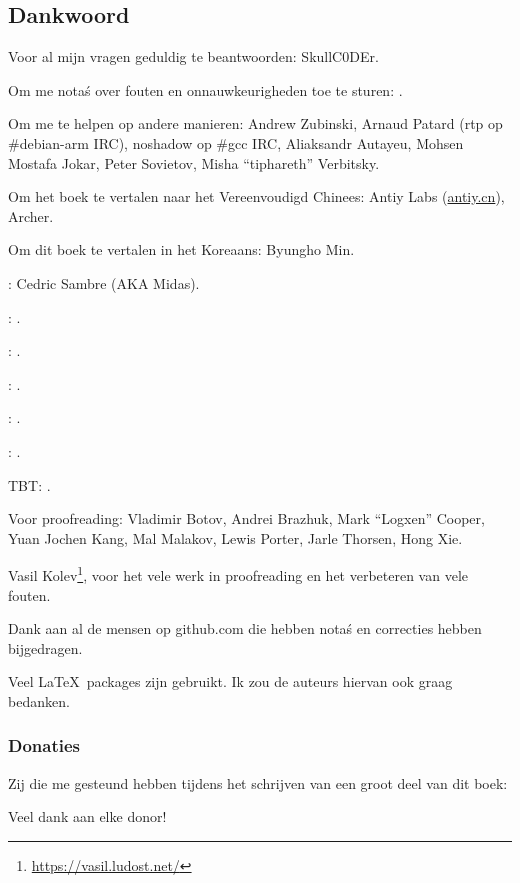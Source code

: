 \subsection*{Dankwoord}

Voor al mijn vragen geduldig te beantwoorden: SkullC0DEr.

Om me nota\'s over fouten en onnauwkeurigheden toe te sturen: \PeopleMistakesInaccuracies{}.

Om me te helpen op andere manieren:
Andrew Zubinski,
Arnaud Patard (rtp op \#debian-arm IRC),
noshadow op \#gcc IRC,
Aliaksandr Autayeu, Mohsen Mostafa Jokar,
Peter Sovietov,
Misha ``tiphareth'' Verbitsky.

Om het boek te vertalen naar het Vereenvoudigd Chinees:
Antiy Labs (\href{http://antiy.cn}{antiy.cn}), Archer.

Om dit boek te vertalen in het Koreaans: Byungho Min.

\NLph{}: Cedric Sambre (AKA Midas).

\NLph{}: \PeopleSpanishTranslators{}.

\NLph{}: \PeoplePTBRTranslators{}.

\NLph{}: \PeopleItalianTranslators{}.

\NLph{}: \PeopleFrenchTranslators{}.

\NLph{}: \PeopleGermanTranslators{}.

\ac{TBT}: \PeoplePolishTranslators{}.


Voor proofreading:
Vladimir Botov,
Andrei Brazhuk,
Mark ``Logxen'' Cooper, Yuan Jochen Kang, Mal Malakov, Lewis Porter, Jarle Thorsen, Hong Xie.

Vasil Kolev\footnote{\url{https://vasil.ludost.net/}}, voor het vele werk in proofreading en het verbeteren van vele fouten.

Dank aan al de mensen op github.com die hebben nota\'s en correcties hebben bijgedragen.

Veel \LaTeX\ packages zijn gebruikt. Ik zou de auteurs hiervan ook graag bedanken.

\subsubsection*{Donaties}

Zij die me gesteund hebben tijdens het schrijven van een groot deel van dit boek:



Veel dank aan elke donor!
